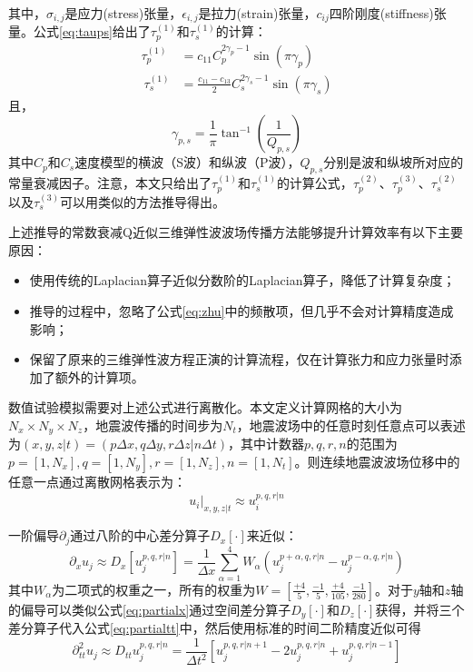 \documentclass[degree=doctor]{thuthesis}
\begin{document}
其中，$\sigma_{i,j}$是应力(stress)张量，$\epsilon_{i,j}$是拉力(strain)张量，$c_{ij}$四阶刚度(stiffness)张量。公式\ref{eq:taups}给出了$\tau_p^{(1)}$和$\tau_s^{(1)}$的计算：
\begin{equation}
\begin{aligned}
  \tau_p^{(1)} &= c_{11}C_p^{2\gamma_p - 1}\sin(\pi \gamma_p) \\
  ~
  \tau_s^{(1)} &= \frac{c_{11} - c_{13}}{2}C_s^{2\gamma_s - 1}\sin(\pi \gamma_s)
\end{aligned}
\label{eq:taups}
\end{equation}
且，
\begin{equation}
  \gamma_{p,s}=\frac{1}{\pi}\tan^{-1}(\frac{1}{Q_{p,s}})
\end{equation}
其中$C_p$和$C_s$速度模型的横波（S波）和纵波（P波），$Q_{p,s}$分别是波和纵坡所对应的常量衰减因子。注意，本文只给出了$\tau_p^{(1)}$和$\tau_s^{(1)}$的计算公式，$\tau_p^{(2)}$、$\tau_p^{(3)}$、$\tau_s^{(2)}$以及$\tau_s^{(3)}$可以用类似的方法推导得出。

上述推导的常数衰减Q近似三维弹性波波场传播方法能够提升计算效率有以下主要原因：
\begin{itemize}
  \item 使用传统的Laplacian算子近似分数阶的Laplacian算子，降低了计算复杂度；
  \item 推导的过程中，忽略了公式\ref{eq:zhu}中的频散项，但几乎不会对计算精度造成影响\cite{shen2015image}；
  \item 保留了原来的三维弹性波方程正演的计算流程，仅在计算张力和应力张量时添加了额外的计算项。
\end{itemize}  

数值试验模拟需要对上述公式进行离散化。本文定义计算网格的大小为$N_x \times N_y \times N_z$，地震波传播的时间步为$N_t$，地震波场中的任意时刻任意点可以表述为$(x,y,z|t)=(p\Delta x,q\Delta y, r\Delta z| n\Delta t)$，其中计数器$p,q,r,n$的范围为$p=[1,N_x], q=[1,N_y], r=[1,N_z], n=[1,N_t]$。则连续地震波波场位移中的任意一点通过离散网格表示为：
\begin{equation}
  u_i|_{x,y,z|t} \approx u_i^{p,q,r|n}
\end{equation}

一阶偏导$\partial_j$通过八阶的中心差分算子$D_x[\cdot]$来近似\cite{trefethen1996finite}：
\begin{equation}
  \partial_x u_j \approx D_x[u_j^{p,q,r|n}] = \frac{1}{\Delta x}\sum_{\alpha=1}^4W_\alpha\left(u_j^{p+\alpha,q,r|n} - u_j^{p-\alpha,q,r|n}\right)
  \label{eq:partialx}
\end{equation}
其中$W_\alpha$为二项式的权重之一，所有的权重为$W=\left[ \frac{+4}{5}, \frac{-1}{5}, \frac{+4}{105}, \frac{-1}{280}\right]$。对于$y$轴和$z$轴的偏导可以类似公式\ref{eq:partialx}通过空间差分算子$D_y[\cdot]$和$D_z[\cdot]$获得，并将三个差分算子代入公式\ref{eq:partialtt}中，然后使用标准的时间二阶精度近似可得
\begin{equation}
  \partial_{tt}^2u_j \approx D_{tt}u_j^{p,q,r|n}=\frac{1}{\Delta t^2}\left[ u_j^{p,q,r|n+1} - 2u_j^{p,q,r|n} + u_j^{p,q,r|n-1} \right]
\end{equation}
\end{document}
